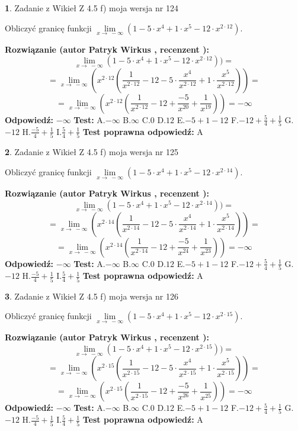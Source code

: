 \documentclass[12pt, a4paper]{article}
\theoremstyle{definition} %
\newtheorem{zad}{}
\newcommand{\zadStart}[1]{\begin{zad}#1\newline}
\newcommand{\zadStop}{\end{zad}}
\newcommand{\rozwStart}[2]{\noindent \textbf{Rozwiązanie (autor #1 , recenzent #2): }\newline}
\newcommand{\rozwStop}{\newline}
\newcommand{\odpStart}{\noindent \textbf{Odpowiedź:}\newline}
\newcommand{\odpStop}{\newline}
\newcommand{\testStart}{\noindent \textbf{Test:}\newline}
\newcommand{\testStop}{\newline}
\newcommand{\kluczStart}{\noindent \textbf{Test poprawna odpowiedź:}\newline}
\newcommand{\kluczStop}{\newline}
\begin{document}
\zadStart{Zadanie z Wikieł Z 4.5 f) moja wersja nr 124}



Obliczyć granicę funkcji  $\lim\limits_{x\to\ -\infty}(1 - 5 \cdot x^{4}+1 \cdot x^{5}- 12 \cdot x^{2\cdot12})$.
\zadStop
\rozwStart{Patryk Wirkus}{}
$$\lim\limits_{x\to\ -\infty}(1 - 5 \cdot x^{4}+1 \cdot x^{5}- 12 \cdot x^{2\cdot12}))=$$
$$=\lim\limits_{x\to\ -\infty}(x^{2\cdot12}(\frac{1}{x^{2\cdot12}}-12 -5 \cdot \frac{x^{4}}{x^{2\cdot12}}+1 \cdot \frac{x^{5}}{x^{2\cdot12}}))=$$
$$=\lim\limits_{x\to\ -\infty}(x^{2\cdot12}(\frac{1}{x^{2\cdot12}}-12 + \frac{-5}{x^{20}}+ \frac{1}{x^{19}}))=-\infty$$
\rozwStop
\odpStart
$-\infty$
\odpStop
\testStart
A.$-\infty$ B.$\infty$ C.$0$ D.$12$ E.$-5 + 1 - 12$
F.$-12+\frac{5}{4}+\frac{1}{5}$ G.$-12$
H.$\frac{-5}{4}+\frac{1}{5}$
I.$\frac{5}{4}+\frac{1}{5}$
\testStop
\kluczStart
A
\kluczStop



\zadStart{Zadanie z Wikieł Z 4.5 f) moja wersja nr 125}



Obliczyć granicę funkcji  $\lim\limits_{x\to\ -\infty}(1 - 5 \cdot x^{4}+1 \cdot x^{5}- 12 \cdot x^{2\cdot14})$.
\zadStop
\rozwStart{Patryk Wirkus}{}
$$\lim\limits_{x\to\ -\infty}(1 - 5 \cdot x^{4}+1 \cdot x^{5}- 12 \cdot x^{2\cdot14}))=$$
$$=\lim\limits_{x\to\ -\infty}(x^{2\cdot14}(\frac{1}{x^{2\cdot14}}-12 -5 \cdot \frac{x^{4}}{x^{2\cdot14}}+1 \cdot \frac{x^{5}}{x^{2\cdot14}}))=$$
$$=\lim\limits_{x\to\ -\infty}(x^{2\cdot14}(\frac{1}{x^{2\cdot14}}-12 + \frac{-5}{x^{24}}+ \frac{1}{x^{23}}))=-\infty$$
\rozwStop
\odpStart
$-\infty$
\odpStop
\testStart
A.$-\infty$ B.$\infty$ C.$0$ D.$12$ E.$-5 + 1 - 12$
F.$-12+\frac{5}{4}+\frac{1}{5}$ G.$-12$
H.$\frac{-5}{4}+\frac{1}{5}$
I.$\frac{5}{4}+\frac{1}{5}$
\testStop
\kluczStart
A
\kluczStop



\zadStart{Zadanie z Wikieł Z 4.5 f) moja wersja nr 126}



Obliczyć granicę funkcji  $\lim\limits_{x\to\ -\infty}(1 - 5 \cdot x^{4}+1 \cdot x^{5}- 12 \cdot x^{2\cdot15})$.
\zadStop
\rozwStart{Patryk Wirkus}{}
$$\lim\limits_{x\to\ -\infty}(1 - 5 \cdot x^{4}+1 \cdot x^{5}- 12 \cdot x^{2\cdot15}))=$$
$$=\lim\limits_{x\to\ -\infty}(x^{2\cdot15}(\frac{1}{x^{2\cdot15}}-12 -5 \cdot \frac{x^{4}}{x^{2\cdot15}}+1 \cdot \frac{x^{5}}{x^{2\cdot15}}))=$$
$$=\lim\limits_{x\to\ -\infty}(x^{2\cdot15}(\frac{1}{x^{2\cdot15}}-12 + \frac{-5}{x^{26}}+ \frac{1}{x^{25}}))=-\infty$$
\rozwStop
\odpStart
$-\infty$
\odpStop
\testStart
A.$-\infty$ B.$\infty$ C.$0$ D.$12$ E.$-5 + 1 - 12$
F.$-12+\frac{5}{4}+\frac{1}{5}$ G.$-12$
H.$\frac{-5}{4}+\frac{1}{5}$
I.$\frac{5}{4}+\frac{1}{5}$
\testStop
\kluczStart
A
\kluczStop
\end{document}
